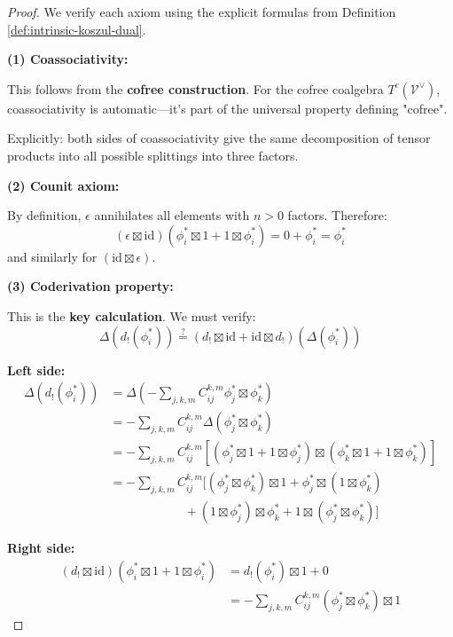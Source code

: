 \begin{proof}
We verify each axiom using the explicit formulas from Definition \ref{def:intrinsic-koszul-dual}.

\medskip
\noindent\textbf{(1) Coassociativity:}

This follows from the \textbf{cofree construction}. For the cofree coalgebra $T^c(\mathcal{V}^{\vee})$, coassociativity is automatic---it's part of the universal property defining "cofree".

Explicitly: both sides of coassociativity give the same decomposition of tensor products into all possible splittings into three factors.

\medskip
\noindent\textbf{(2) Counit axiom:}

By definition, $\epsilon$ annihilates all elements with $n > 0$ factors. Therefore:
$$(\epsilon \boxtimes \mathrm{id})(\phi_i^* \boxtimes 1 + 1 \boxtimes \phi_i^*) = 0 + \phi_i^* = \phi_i^*$$
and similarly for $(\mathrm{id} \boxtimes \epsilon)$.

\medskip
\noindent\textbf{(3) Coderivation property:}

This is the \textbf{key calculation}. We must verify:
$$\Delta(d_!(\phi_i^*)) \stackrel{?}{=} (d_! \boxtimes \mathrm{id} + \mathrm{id} \boxtimes d_!)(\Delta(\phi_i^*))$$

\textbf{Left side:}
\begin{align*}
\Delta(d_!(\phi_i^*)) &= \Delta\left(-\sum_{j,k,m} C_{ij}^{k,m} \phi_j^* \boxtimes \phi_k^*\right) \\
&= -\sum_{j,k,m} C_{ij}^{k,m} \Delta(\phi_j^* \boxtimes \phi_k^*) \\
&= -\sum_{j,k,m} C_{ij}^{k,m} [(\phi_j^* \boxtimes 1 + 1 \boxtimes \phi_j^*) \boxtimes (\phi_k^* \boxtimes 1 + 1 \boxtimes \phi_k^*)] \\
&= -\sum_{j,k,m} C_{ij}^{k,m} [(\phi_j^* \boxtimes \phi_k^*) \boxtimes 1 + \phi_j^* \boxtimes (1 \boxtimes \phi_k^*) \\
&\qquad\qquad\qquad + (1 \boxtimes \phi_j^*) \boxtimes \phi_k^* + 1 \boxtimes (\phi_j^* \boxtimes \phi_k^*)]
\end{align*}

\textbf{Right side:}
\begin{align*}
(d_! \boxtimes \mathrm{id})(\phi_i^* \boxtimes 1 + 1 \boxtimes \phi_i^*) &= d_!(\phi_i^*) \boxtimes 1 + 0 \\
&= -\sum_{j,k,m} C_{ij}^{k,m} (\phi_j^* \boxtimes \phi_k^*) \boxtimes 1
\end{align*}


\end{proof}
